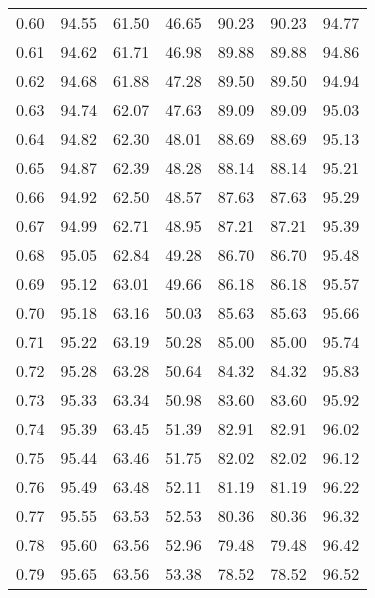 \begin{tabular}{|c|c|c|c|c|c|c|}
      0.60 &     94.55 &     61.50 &      46.65 &   90.23 &      90.23 &         94.77 \\
      0.61 &     94.62 &     61.71 &      46.98 &   89.88 &      89.88 &         94.86 \\
      0.62 &     94.68 &     61.88 &      47.28 &   89.50 &      89.50 &         94.94 \\
      0.63 &     94.74 &     62.07 &      47.63 &   89.09 &      89.09 &         95.03 \\
      0.64 &     94.82 &     62.30 &      48.01 &   88.69 &      88.69 &         95.13 \\
      0.65 &     94.87 &     62.39 &      48.28 &   88.14 &      88.14 &         95.21 \\
      0.66 &     94.92 &     62.50 &      48.57 &   87.63 &      87.63 &         95.29 \\
      0.67 &     94.99 &     62.71 &      48.95 &   87.21 &      87.21 &         95.39 \\
      0.68 &     95.05 &     62.84 &      49.28 &   86.70 &      86.70 &         95.48 \\
      0.69 &     95.12 &     63.01 &      49.66 &   86.18 &      86.18 &         95.57 \\
      0.70 &     95.18 &     63.16 &      50.03 &   85.63 &      85.63 &         95.66 \\
      0.71 &     95.22 &     63.19 &      50.28 &   85.00 &      85.00 &         95.74 \\
      0.72 &     95.28 &     63.28 &      50.64 &   84.32 &      84.32 &         95.83 \\
      0.73 &     95.33 &     63.34 &      50.98 &   83.60 &      83.60 &         95.92 \\
      0.74 &     95.39 &     63.45 &      51.39 &   82.91 &      82.91 &         96.02 \\
      0.75 &     95.44 &     63.46 &      51.75 &   82.02 &      82.02 &         96.12 \\
      0.76 &     95.49 &     63.48 &      52.11 &   81.19 &      81.19 &         96.22 \\
      0.77 &     95.55 &     63.53 &      52.53 &   80.36 &      80.36 &         96.32 \\
      0.78 &     95.60 &     63.56 &      52.96 &   79.48 &      79.48 &         96.42 \\
      0.79 &     95.65 &     63.56 &      53.38 &   78.52 &      78.52 &         96.52 \\

\end{tabular}
